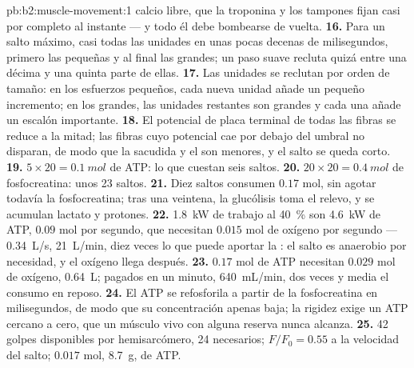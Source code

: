 \begin{solution}{pb:b2:muscle-movement:1}
calcio libre, que la troponina y los tampones fijan casi por completo al
instante --- y todo él debe bombearse de vuelta.
\textbf{16.} Para un salto máximo, casi todas las unidades en unas pocas
decenas de milisegundos, primero las pequeñas y al final las grandes; un
paso suave recluta quizá entre una décima y una quinta parte de ellas.
\textbf{17.} Las unidades se reclutan por orden de tamaño: en los
esfuerzos pequeños, cada nueva unidad añade un pequeño incremento; en los
grandes, las unidades restantes son grandes y cada una añade un escalón
importante.
\textbf{18.} El potencial de placa terminal de todas las fibras se reduce
a la mitad; las fibras cuyo potencial cae por debajo del umbral no
disparan, de modo que la sacudida y el  son menores, y el salto se
queda corto.
\textbf{19.} $5\times 20 = \qty{0.1}{mol}$ de ATP: lo que cuestan seis
saltos.
\textbf{20.} $20\times 20 = \qty{0.4}{mol}$ de fosfocreatina: unos 23
saltos.
\textbf{21.} Diez saltos consumen $0.17$ mol, sin agotar todavía la
fosfocreatina; tras una veintena, la glucólisis toma el relevo, y se
acumulan lactato y protones.
\textbf{22.} \qty{1.8}{kW} de trabajo al \qty{40}{\%} son \qty{4.6}{kW} de
ATP, $0.09$ mol por segundo, que necesitan $0.015$ mol de oxígeno por
segundo --- \qty{0.34}{L/s}, \qty{21}{L/min}, diez veces lo que puede
aportar la : el salto es anaerobio por necesidad, y el oxígeno llega
después.
\textbf{23.} $0.17$ mol de ATP necesitan $0.029$ mol de oxígeno,
\qty{0.64}{L}; pagados en un minuto, \qty{640}{mL/min}, dos veces y media
el consumo en reposo.
\textbf{24.} El ATP se refosforila a partir de la fosfocreatina en
milisegundos, de modo que su concentración apenas baja; la rigidez exige
un ATP cercano a cero, que un músculo vivo con alguna reserva nunca
alcanza.
\textbf{25.} 42 golpes disponibles por hemisarcómero, 24 necesarios;
$F/F_0 = 0.55$ a la velocidad del salto; $0.017$ mol, \qty{8.7}{g}, de ATP.
\end{solution}
